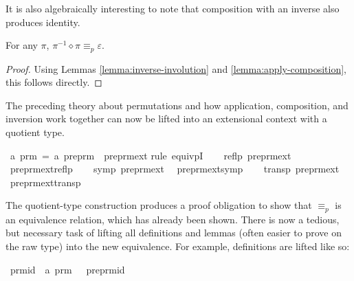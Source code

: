 It is also algebraically interesting to note that composition with an inverse also produces identity.
\begin{lemma}
\label{lemma:group-inverse}
For any \(\pi\), \(\pi^{-1} \diamond \pi \equiv_p \varepsilon\).
\end{lemma}
\begin{proof}
Using Lemmas \ref{lemma:inverse-involution} and \ref{lemma:apply-composition}, this follows directly.
\end{proof}

The preceding theory about permutations and how application, composition, and inversion work together can now be lifted into an extensional context with a quotient type.

\begin{implementation}
\isamarkupfalse%
\ {\isacharprime}a\ prm\ =\ {\isachardoublequoteopen}{\isacharprime}a\ preprm{\isachardoublequoteclose}\ {\isacharslash}\ preprm{\isacharunderscore}ext\isanewline
%
\isatagproof
{}\isamarkupfalse%
{\isacharparenleft}rule\ equivpI{\isacharparenright}\isanewline
\ \ \isamarkupfalse%
\ {\isachardoublequoteopen}reflp\ preprm{\isacharunderscore}ext{\isachardoublequoteclose}\ \isamarkupfalse%
\ preprm{\isacharunderscore}ext{\isacharunderscore}reflp\isacommand{{\isachardot}}\isamarkupfalse%
\isanewline
\ \ \isamarkupfalse%
\ {\isachardoublequoteopen}symp\ preprm{\isacharunderscore}ext{\isachardoublequoteclose}\ \isamarkupfalse%
\ preprm{\isacharunderscore}ext{\isacharunderscore}symp\isacommand{{\isachardot}}\isamarkupfalse%
\isanewline
\ \ \isamarkupfalse%
\ {\isachardoublequoteopen}transp\ preprm{\isacharunderscore}ext{\isachardoublequoteclose}\ \isamarkupfalse%
\ preprm{\isacharunderscore}ext{\isacharunderscore}transp\isacommand{{\isachardot}}\isamarkupfalse%
\isanewline
{}\isamarkupfalse%
\endisatagproof
\end{implementation}

The quotient-type construction produces a proof obligation to show that \(\equiv_p\) is an equivalence relation, which has already been shown.
There is now a tedious, but necessary task of lifting all definitions and lemmas (often easier to prove on the raw type) into the new equivalence.
For example, definitions are lifted like so:

\begin{implementation}
\isamarkupfalse%
\ prm{\isacharunderscore}id\ {\isacharcolon}{\isacharcolon}\ {\isachardoublequoteopen}{\isacharprime}a\ prm{\isachardoublequoteclose}\ {\isacharparenleft}{\isachardoublequoteopen}{\isasymepsilon}{\isachardoublequoteclose}{\isacharparenright}\ \ preprm{\isacharunderscore}id%
\end{implementation}

